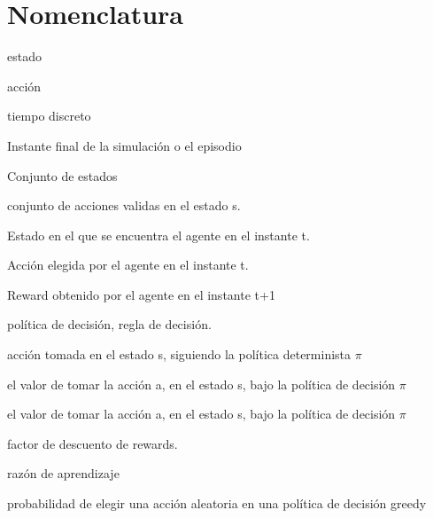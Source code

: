 
\chapter{Nomenclatura}

\begin{description}[labelindent=1cm,labelwidth=2.25cm,align=left,leftmargin=3.45cm]  %
	\item[$s$] estado
	\item[$a$] acción
	\item[$t$] tiempo discreto
	\item[$T$] Instante final de la simulación o el episodio
	\item[$S$] Conjunto de estados
	\item[$A(s)$] conjunto de acciones validas en el estado s.
	\item[$S_t$] Estado en el que se encuentra el agente en el instante t.
	\item[$A_t$] Acción elegida por el agente en el instante t.
	\item[$R_t$] Reward obtenido por el agente en el instante t+1
	\item[$\pi$] política de decisión, regla de decisión.
	\item[$\pi(s)$] acción tomada en el estado s, siguiendo la política determinista $\pi$ 
	\item[$q_\pi(s, a)$] el valor de tomar la acción a, en el estado s, bajo la política de decisión $\pi$
	\item[$q_*(s, a)$] el valor de tomar la acción a, en el estado s, bajo la política de decisión $\pi$
	\item[$\gamma$] factor de descuento de rewards.
    \item[$\alpha$] razón de aprendizaje
    \item[$\varepsilon$] probabilidad de elegir una acción aleatoria en una política de decisión greedy
\end{description}
